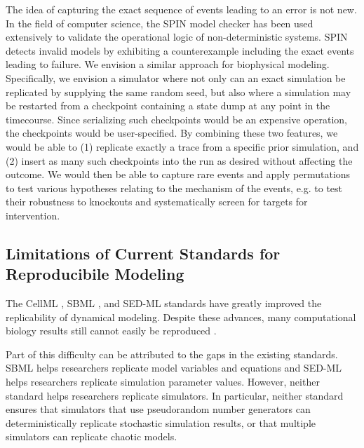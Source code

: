 \documentclass[journal,transmag,twoside]{IEEEtran}
\begin{document}
The idea of capturing the exact sequence of events leading to an error is not new. In the field of computer science, the SPIN model checker \cite{holzmann2004spin} \cite{holzmann1997model} has been used extensively to validate the operational logic of non-deterministic systems. SPIN detects invalid models by exhibiting a counterexample including the exact events leading to failure. We envision a similar approach for biophysical modeling. Specifically, we envision a simulator where not only can an exact simulation be replicated by supplying the same random seed, but also where a simulation may be restarted from a checkpoint containing a state dump at any point in the timecourse. Since serializing such checkpoints would be an expensive operation, the checkpoints would be user-specified. By combining these two features, we would be able to (1) replicate exactly a trace from a specific prior simulation, and (2) insert as many such checkpoints into the run as desired without affecting the outcome. We would then be able to capture rare events and apply permutations to test various hypotheses relating to the mechanism of the events, e.g. to test their robustness to knockouts and systematically screen for targets for intervention.


\subsection{Limitations of Current Standards for Reproducibile Modeling}

The CellML \cite{cuellar2003overview}, SBML \cite{hucka2003}, and SED-ML \cite{sedml2011} standards have greatly improved the replicability of dynamical modeling.
Despite these advances, many computational biology results still cannot easily be reproduced \cite{garijo2013quantifying}.

Part of this difficulty can be attributed to the gaps in the existing standards.
SBML helps researchers replicate model variables and equations and SED-ML helps researchers replicate simulation parameter values. 
However, neither standard helps researchers replicate simulators. 
In particular, neither standard ensures that simulators that use pseudorandom number generators can deterministically replicate stochastic simulation results, 
or that multiple simulators can replicate chaotic models.
\end{document}

